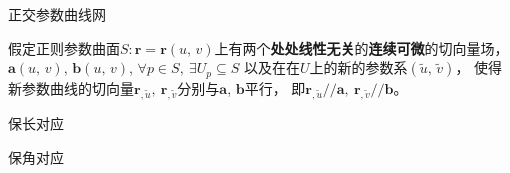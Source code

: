 正交参数曲线网

\begin{theorem}
    假定正则参数曲面$S:\mathbf{r}=\mathbf{r}\left(u,\, v\right)$上有两个\textbf{处处线性无关}的\textbf{连续可微}的切向量场，
    $\mathbf{a}\left(u,\,v\right)$, $\mathbf{b}\left(u,\,v\right)$, $\forall p\in S,\ \exists U_{p}\subseteq S$
    以及在在$U$上的新的参数系$\left(\tilde{u},\,\tilde{v}\right)$，
    使得新参数曲线的切向量$\mathbf{r}_{,\tilde{u}},\ \mathbf{r}_{,\tilde{v}}$分别与$\mathbf{a}$, $\mathbf{b}$平行，
    即$\mathbf{r}_{,\tilde{u}}//\mathbf{a},\ \mathbf{r}_{,\tilde{v}}//\mathbf{b}$。
\end{theorem}
保长对应

保角对应
